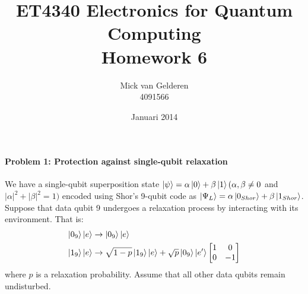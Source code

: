 \documentclass[12pt]{article}
\title{ET4340 Electronics for Quantum Computing\\Homework 6}
\author{
    Mick van Gelderen\\4091566
}
\date{Januari 2014}
\newcommand{\pauli}[1]{
    \ensuremath{
        \begin{bmatrix}
            \if#1x
                0 & 1 \\
                1 & 0 \\
            \fi\if#1y
                0 & -i \\
                i & 0 \\
            \fi\if#1z
                1 & 0 \\
                0 & -1 \\
            \fi
        \end{bmatrix}
    }
}
\begin{document}
\maketitle

\paragraph{Problem 1: Protection against single-qubit relaxation} \hfill

We have a single-qubit superposition state $\ket{\psi} = \alpha\ket{0} + \beta\ket{1} (\alpha, \beta \neq 0$ and $ |\alpha|^2 + |\beta|^2 = 1)$ encoded using Shor's 9-qubit code as $\ket{\Psi_L} = \alpha\ket{0_{Shor}} + \beta\ket{1_{Shor}}$. Suppose that data qubit 9 undergoes a relaxation process by interacting with its environment. That is:
\begin{align*}
    \ket{0_9}\ket{e} &\rightarrow \ket{0_9}\ket{e} \\
    \ket{1_9}\ket{e} &\rightarrow \sqrt{1 - p}\ket{1_9}\ket{e} + \sqrt{p}\ket{0_9}\ket{e'}
    \pauli{z}
\end{align*}
where $p$ is a relaxation probability. Assume that all other data qubits remain undisturbed.
\end{document}
